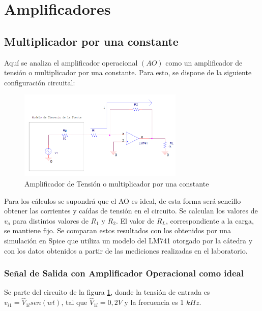 \section{Amplificadores}
\label{sec:ampli}

\subsection{Multiplicador por una constante}

Aquí se analiza el amplificador operacional $(AO)$ como un amplificador de tensión o multiplicador por una constante. Para esto, se dispone de la siguiente configuración circuital:


\begin{figure}[h]
  \centering
      \includegraphics[width=0.7\textwidth]{gfxhernan/FIG21modif.PNG}
  \caption{Amplificador de Tensión o multiplicador por una constante}
  \label{circ:multipl}
\end{figure}
        
Para los cálculos se supondrá que el AO es ideal, de esta forma será sencillo obtener las corrientes y caídas de tensión en el circuito. Se calculan los valores de $v_{o}$ para distintos valores de $R_{1}$ y $R_{2}$. El valor de $R_{L}$, correspondiente a la carga, se mantiene fijo. Se comparan estos resultados con los obtenidos por una simulación en Spice que utiliza un modelo del LM741 otorgado por la cátedra y con los datos obtenidos a partir de las mediciones realizadas en el laboratorio.\\

\subsubsection{Señal de Salida con Amplificador Operacional como ideal}
Se parte del circuito de la figura \ref{circ:multipl}, donde la tensión de entrada es $ v_{i1}=\hat{V}_{1l} sen(wt)$, tal que $\hat{V}_{1l} = 0,2 V$ y la frecuencia es 1 $kHz$.

